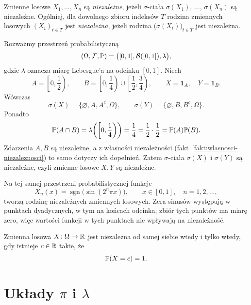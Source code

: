 \begin{definicja}
\label{def:niezaleznosc-rodziny-zmiennych}
Zmienne losowe $X_1,\ldots,X_n$ są \emph{niezależne}, jeżeli
$\sigma$-ciała $\sigma(X_1)$, $\ldots$, $\sigma(X_n)$ są niezależne.
Ogólniej, dla dowolnego zbioru indeksów $T$ rodzina zmiennych losowych
$(X_t)_{t\in T}$ jest \emph{niezależna}, jeżeli rodzina
$\bigl(\sigma(X_t)\bigr)_{t\in T}$ jest niezależna.
\end{definicja}

\begin{przyklad}
\label{przykl:niezalezne-indykatory}
Rozważmy przestrzeń probabilistyczną
\[
  (\Omega,\mathcal{F},\mathbb{P})=\bigl([0,1],\mathcal{B}([0,1]),\lambda\bigr),
\]
gdzie $\lambda$ oznacza miarę Lebesgue'a na odcinku $[0,1]$.
Niech
\[
  A=\left[0,\frac12\right),
  \qquad
  B=\left[0,\frac14\right)\cup\left[\frac12,\frac34\right),
  \qquad X=\mathbf{1}_A,\quad Y=\mathbf{1}_B.
\]
Wówczas
\[
  \sigma(X)=\{\varnothing,A,A^c,\Omega\},
  \qquad
  \sigma(Y)=\{\varnothing,B,B^c,\Omega\}.
\]
Ponadto
\[
  \mathbb{P}(A\cap B)
    =\lambda\!\left(\left[0,\frac14\right)\right)
    =\frac14=\frac12\cdot\frac12=\mathbb{P}(A)\mathbb{P}(B).
\]
Zdarzenia $A,B$ są niezależne, a z własności niezależności
(fakt~\ref{fakt:wlasnosci-niezaleznosci}) to samo dotyczy ich dopełnień.
Zatem $\sigma$-ciała $\sigma(X)$ i $\sigma(Y)$ są niezależne,
czyli zmienne losowe $X,Y$ są niezależne.
\end{przyklad}

\begin{przyklad}
\label{przykl:rademacher}
Na tej samej przestrzeni probabilistycznej funkcje
\[
  X_n(x)=\operatorname{sgn}\!\bigl(\sin(2^n\pi x)\bigr),
  \qquad x\in[0,1],\quad n=1,2,\ldots,
\]
tworzą rodzinę niezależnych zmiennych losowych.
Zera sinusów występują w punktach dyadycznych, w tym na końcach odcinka;
zbiór tych punktów ma miarę zero, więc wartości funkcji w tych punktach
nie wpływają na niezależność.
\end{przyklad}

\begin{fakt}
\label{fakt:zmienna-niezalezna-od-siebie}
Zmienna losowa $X\colon\Omega\to\mathbb{R}$ jest niezależna od samej siebie
wtedy i tylko wtedy, gdy istnieje $c\in\mathbb{R}$ takie, że
\[
  \mathbb{P}(X=c)=1.
\]
\end{fakt}

\section{Układy \texorpdfstring{$\pi$ i $\lambda$}{pi i lambda}}
\label{sec:pi-lambda}

